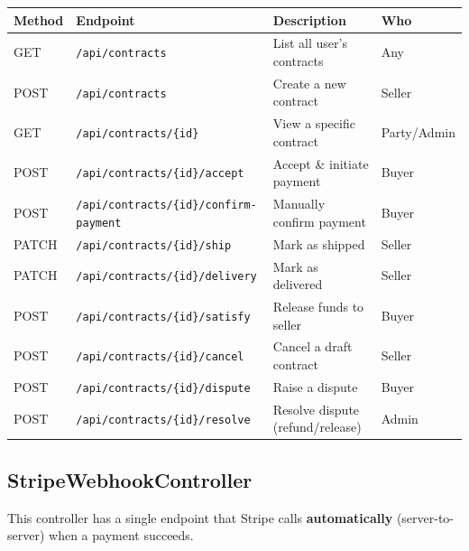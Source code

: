\documentclass[11pt, a4paper]{article}
\begin{document}
\begin{longtable}{@{}llp{5.5cm}l@{}}
\toprule
\textbf{Method} & \textbf{Endpoint} & \textbf{Description} & \textbf{Who} \\
\midrule
GET & \texttt{/api/contracts} & List all user's contracts & Any \\
POST & \texttt{/api/contracts} & Create a new contract & Seller \\
GET & \texttt{/api/contracts/\{id\}} & View a specific contract & Party/Admin \\
POST & \texttt{/api/contracts/\{id\}/accept} & Accept \& initiate payment & Buyer \\
POST & \texttt{/api/contracts/\{id\}/confirm-payment} & Manually confirm payment & Buyer \\
PATCH & \texttt{/api/contracts/\{id\}/ship} & Mark as shipped & Seller \\
PATCH & \texttt{/api/contracts/\{id\}/delivery} & Mark as delivered & Seller \\
POST & \texttt{/api/contracts/\{id\}/satisfy} & Release funds to seller & Buyer \\
POST & \texttt{/api/contracts/\{id\}/cancel} & Cancel a draft contract & Seller \\
POST & \texttt{/api/contracts/\{id\}/dispute} & Raise a dispute & Buyer \\
POST & \texttt{/api/contracts/\{id\}/resolve} & Resolve dispute (refund/release) & Admin \\
\bottomrule
\end{longtable}

\subsection{StripeWebhookController}

This controller has a single endpoint that Stripe calls \textbf{automatically} (server-to-server) when a payment succeeds.
\end{document}
